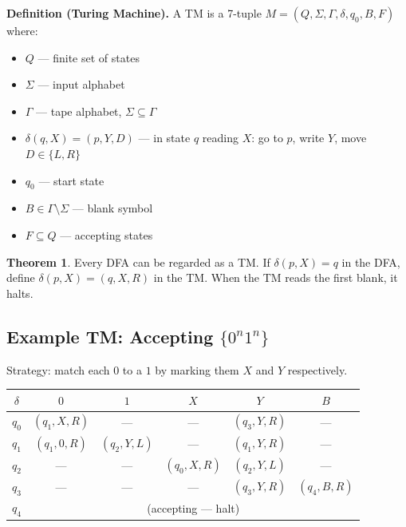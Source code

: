 \documentclass[11pt, a4paper]{article}
\theoremstyle{definition}
\newtheorem{theorem}{Theorem}[section]
\theoremstyle{remark}
\begin{document}
\begin{defbox}
\textbf{Definition (Turing Machine).}  A TM is a 7-tuple
$M=(Q,\Sigma,\Gamma,\delta,q_0,B,F)$ where:
\begin{itemize}[itemsep=2pt]
  \item $Q$ --- finite set of states
  \item $\Sigma$ --- input alphabet
  \item $\Gamma$ --- tape alphabet, $\Sigma\subseteq\Gamma$
  \item $\delta(q,X)=(p,Y,D)$ --- in state $q$ reading $X$: go to $p$, write $Y$,
        move $D\in\{L,R\}$
  \item $q_0$ --- start state
  \item $B\in\Gamma\setminus\Sigma$ --- blank symbol
  \item $F\subseteq Q$ --- accepting states
\end{itemize}
\end{defbox}

\begin{theorem}
Every DFA can be regarded as a TM.  If $\delta(p,X)=q$ in the DFA, define
$\delta(p,X)=(q,X,R)$ in the TM.  When the TM reads the first blank, it halts.
\end{theorem}

\subsection{Example TM: Accepting $\{0^n1^n\}$}

Strategy: match each $0$ to a $1$ by marking them $X$ and $Y$ respectively.

\begin{center}
\begin{tabular}{cccccc}
  \toprule
  $\delta$ & $0$ & $1$ & $X$ & $Y$ & $B$ \\
  \midrule
  $q_0$ & $(q_1,X,R)$ & ---         & ---         & $(q_3,Y,R)$ & ---         \\
  $q_1$ & $(q_1,0,R)$ & $(q_2,Y,L)$ & ---         & $(q_1,Y,R)$ & ---         \\
  $q_2$ & ---         & ---         & $(q_0,X,R)$ & $(q_2,Y,L)$ & ---         \\
  $q_3$ & ---         & ---         & ---         & $(q_3,Y,R)$ & $(q_4,B,R)$ \\
  $q_4$ & \multicolumn{5}{c}{(accepting --- halt)} \\
  \bottomrule
\end{tabular}
\end{center}
\end{document}
